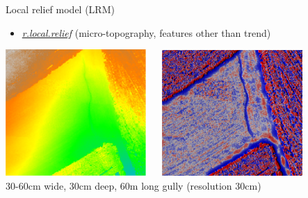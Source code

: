 \documentclass[xcolor={dvipsnames,usenames},beamer,aspectratio=169]{beamer}
\newcommand{\amodule}[1]{\href{http://grass.osgeo.org/grass70/manuals/addons/#1.html}{\emph{#1}}}
\begin{document}
\begin{frame}{Local relief model (LRM)}

\begin{itemize}
  \item \amodule{r.local.relief} (micro-topography, features other than trend)
\end{itemize}

\begin{center}
  \includegraphics[width=0.4\textwidth]{vis/elevation}
  ~~
  \includegraphics[width=0.4\textwidth]{vis/lrm}\\
  \footnotesize
  30-60cm wide, 30cm deep, 60m long gully (resolution 30cm)
\end{center}

\end{frame}
\end{document}
